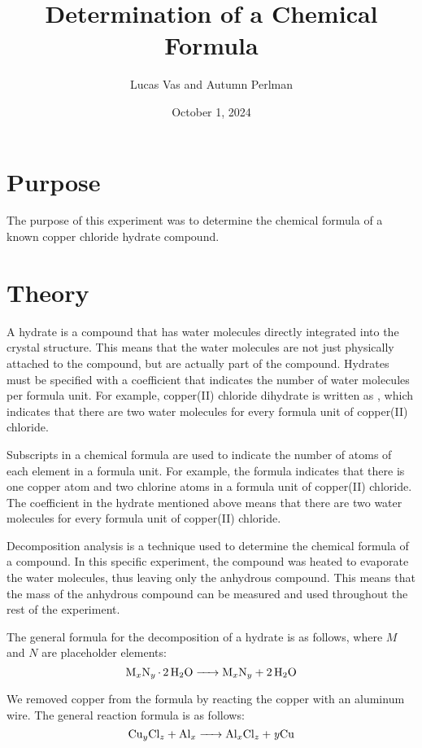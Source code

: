 \documentclass[12pt]{article}
\title{Determination of a Chemical Formula}
\author{Lucas Vas and Autumn Perlman}
\date{October 1, 2024}
\begin{document}
\maketitle

\section*{Purpose}

The purpose of this experiment was to determine the chemical formula of a known copper
chloride hydrate compound.

\section*{Theory}

A hydrate is a compound that has water molecules directly integrated into the crystal
structure. This means that the water molecules are not just physically attached to the
compound, but are actually part of the compound. Hydrates must be specified with a
coefficient that indicates the number of water molecules per formula unit. For example,
copper(II) chloride dihydrate is written as , which indicates that there
are two water molecules for every formula unit of copper(II) chloride.

Subscripts in a chemical formula are used to indicate the number of atoms of each element
in a formula unit. For example, the formula  indicates that there is one copper
atom and two chlorine atoms in a formula unit of copper(II) chloride. The coefficient in
the hydrate mentioned above means that there are two water molecules for every formula unit
of copper(II) chloride.

Decomposition analysis is a technique used to determine the chemical formula of a compound.
In this specific experiment, the compound was heated to evaporate the water molecules, thus
leaving only the anhydrous compound. This means that the mass of the anhydrous compound can
be measured and used throughout the rest of the experiment.

The general formula for the decomposition of a hydrate is as follows, where $M$ and $N$ are
placeholder elements:
\begin{equation*}
    \ce{M_xN_y * 2H2O -> M_xN_y + 2H2O}
\end{equation*}

We removed copper from the formula by reacting the copper with an aluminum wire. The general
reaction formula is as follows:
\begin{equation*}
    \ce{Cu_yCl_z + Al_x -> Al_xCl_z + \mathit{y}Cu}
\end{equation*}
\end{document}
